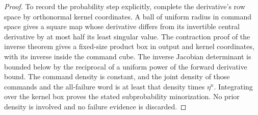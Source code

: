 \begin{proof}
To record the probability step explicitly, complete the derivative's row
space by orthonormal kernel coordinates. A ball of uniform radius in
command space gives a square map whose derivative differs from its
invertible central derivative by at most half its least singular value.
The contraction proof of the inverse theorem gives a fixed-size product
box in output and kernel coordinates, with its inverse inside the command
cube. The inverse Jacobian determinant is bounded below by the reciprocal
of a uniform power of the forward derivative bound. The command density
is constant, and the joint density of those commands and the all-failure
word is at least that density times $\eta^n$. Integrating over the
kernel box proves the stated subprobability minorization. No prior
density is involved and no failure evidence is discarded.
\end{proof}

